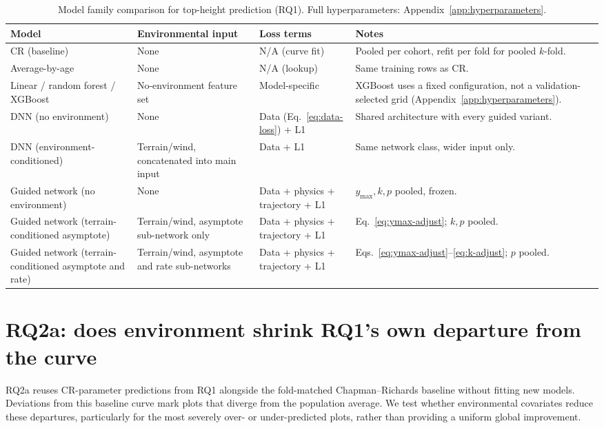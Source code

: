 \begin{table}[!htbp]
\scriptsize
\renewcommand{\arraystretch}{1.2}
\begin{tabular}{p{3.2cm}p{3cm}p{2.6cm}p{4.5cm}}
\toprule
Model & Environmental input & Loss terms & Notes \\
\midrule
CR (baseline) & None & N/A (curve fit) & Pooled per cohort, refit per fold for pooled $k$-fold. \\
Average-by-age & None & N/A (lookup) & Same training rows as CR. \\
Linear / random forest / XGBoost & No-environment feature set & Model-specific & XGBoost uses a
fixed configuration, not a validation-selected grid (Appendix~\ref{app:hyperparameters}). \\
DNN (no environment) & None & Data (Eq.~\ref{eq:data-loss}) + L1 & Shared architecture with every
guided variant. \\
DNN (environment-conditioned) & Terrain/wind, concatenated into main input & Data + L1 & Same
network class, wider input only. \\
Guided network (no environment) & None & Data + physics + trajectory + L1 & $y_{\max},k,p$
pooled, frozen. \\
Guided network (terrain-conditioned asymptote) & Terrain/wind, asymptote sub-network only & Data +
physics + trajectory + L1 & Eq.~\ref{eq:ymax-adjust}; $k,p$ pooled. \\
Guided network (terrain-conditioned asymptote and rate) & Terrain/wind, asymptote and rate
sub-networks & Data + physics + trajectory + L1 & Eqs.~\ref{eq:ymax-adjust}--\ref{eq:k-adjust};
$p$ pooled. \\
\bottomrule
\end{tabular}
\caption{Model family comparison for top-height prediction (RQ1). Full hyperparameters:
Appendix~\ref{app:hyperparameters}.}
\label{tab:rq1-models}
\end{table}


\section{RQ2a: does environment shrink RQ1's own departure from the curve}
RQ2a reuses CR-parameter predictions from RQ1 alongside the fold-matched Chapman--Richards baseline without fitting new models. Deviations from this baseline curve mark plots that diverge from the population average. We test whether environmental covariates reduce these departures, particularly for the most severely over- or under-predicted plots, rather than providing a uniform global improvement.

